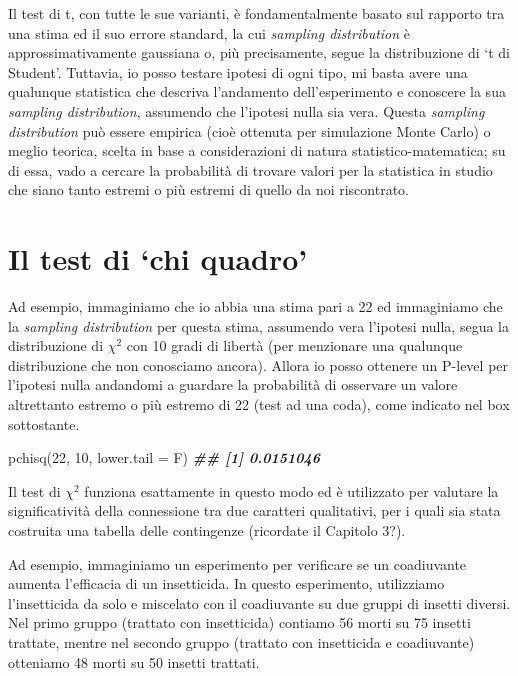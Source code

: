 \documentclass[
  12pt,
]{book}
\newenvironment{Shaded}{\begin{snugshade}}{\end{snugshade}}
\newcommand{\AttributeTok}[1]{\textcolor[rgb]{0.77,0.63,0.00}{#1}}
\newcommand{\DecValTok}[1]{\textcolor[rgb]{0.00,0.00,0.81}{#1}}
\newcommand{\DocumentationTok}[1]{\textcolor[rgb]{0.56,0.35,0.01}{\textbf{\textit{#1}}}}
\newcommand{\FunctionTok}[1]{\textcolor[rgb]{0.00,0.00,0.00}{#1}}
\newcommand{\NormalTok}[1]{#1}
\begin{document}
Il test di t, con tutte le sue varianti, è fondamentalmente basato sul rapporto tra una stima ed il suo errore standard, la cui \emph{sampling distribution} è approssimativamente gaussiana o, più precisamente, segue la distribuzione di `t di Student'. Tuttavia, io posso testare ipotesi di ogni tipo, mi basta avere una qualunque statistica che descriva l'andamento dell'esperimento e conoscere la sua \emph{sampling distribution}, assumendo che l'ipotesi nulla sia vera. Questa \emph{sampling distribution} può essere empirica (cioè ottenuta per simulazione Monte Carlo) o meglio teorica, scelta in base a considerazioni di natura statistico-matematica; su di essa, vado a cercare la probabilità di trovare valori per la statistica in studio che siano tanto estremi o più estremi di quello da noi riscontrato.

\hypertarget{il-test-di-chi-quadro}{%
\section{Il test di `chi quadro'}\label{il-test-di-chi-quadro}}

Ad esempio, immaginiamo che io abbia una stima pari a 22 ed immaginiamo che la \emph{sampling distribution} per questa stima, assumendo vera l'ipotesi nulla, segua la distribuzione di \(\chi^2\) con 10 gradi di libertà (per menzionare una qualunque distribuzione che non conosciamo ancora). Allora io posso ottenere un P-level per l'ipotesi nulla andandomi a guardare la probabilità di osservare un valore altrettanto estremo o più estremo di 22 (test ad una coda), come indicato nel box sottostante.

\begin{Shaded}
\begin{Highlighting}[]
\FunctionTok{pchisq}\NormalTok{(}\DecValTok{22}\NormalTok{, }\DecValTok{10}\NormalTok{, }\AttributeTok{lower.tail =}\NormalTok{ F)}
\DocumentationTok{\#\# [1] 0.0151046}
\end{Highlighting}
\end{Shaded}

Il test di \(\chi^2\) funziona esattamente in questo modo ed è utilizzato per valutare la significatività della connessione tra due caratteri qualitativi, per i quali sia stata costruita una tabella delle contingenze (ricordate il Capitolo 3?).

Ad esempio, immaginiamo un esperimento per verificare se un coadiuvante aumenta l'efficacia di un insetticida. In questo esperimento, utilizziamo l'insetticida da solo e miscelato con il coadiuvante su due gruppi di insetti diversi. Nel primo gruppo (trattato con insetticida) contiamo 56 morti su 75 insetti trattate, mentre nel secondo gruppo (trattato con insetticida e coadiuvante) otteniamo 48 morti su 50 insetti trattati.
\end{document}
